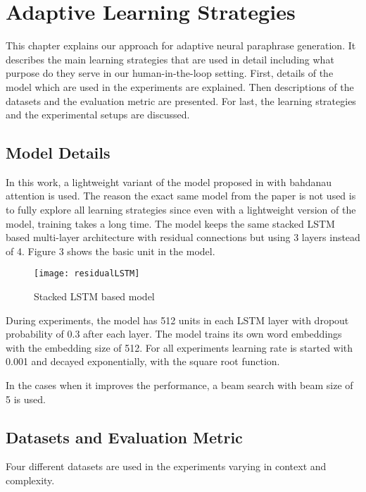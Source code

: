 \chapter{Adaptive Learning Strategies}\label{approach}

This chapter explains our approach for adaptive neural paraphrase generation. It describes the main learning strategies that are used in detail including what purpose do they serve in our human-in-the-loop setting. First, details of the model which are used in the experiments are explained. Then descriptions of the datasets and the evaluation metric are presented. For last, the learning strategies and the experimental setups are discussed.

\section{Model Details}

In this work, a lightweight variant of the model proposed in  \cite{Prakashetal} with bahdanau attention \cite{bahdanau} is used. The reason the exact same model from the paper is not used is to fully explore all learning strategies since even with a lightweight version of the model, training takes a long time. The model keeps the same stacked LSTM based multi-layer architecture with residual connections but using 3 layers instead of 4. Figure 3 shows the basic unit in the model.

\begin{figure}[t]
\texttt{[image: residualLSTM]}
\centering
\caption{Stacked LSTM based model \cite{Prakashetal}}
\end{figure}

During experiments, the model has 512 units in each LSTM layer with dropout probability of 0.3 after each layer. The model trains its own word embeddings with the embedding size of 512. For all experiments learning rate is started with 0.001 and decayed exponentially, with the square root function.

In the cases when it improves the performance, a beam search with beam size of 5 is used.

\section{Datasets and Evaluation Metric}

Four different datasets are used in the experiments varying in context and complexity. 

